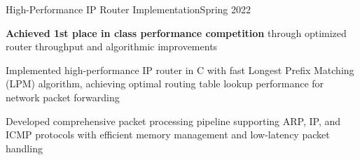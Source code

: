 \begin{joblong}{High-Performance IP Router Implementation}{Spring 2022}
	\item \textbf{Achieved 1st place in class performance competition} through optimized router throughput and algorithmic improvements
	\item Implemented high-performance IP router in C with fast Longest Prefix Matching (LPM) algorithm, achieving optimal routing table lookup performance for network packet forwarding
	\item Developed comprehensive packet processing pipeline supporting ARP, IP, and ICMP protocols with efficient memory management and low-latency packet handling
\end{joblong}